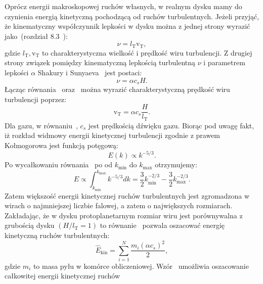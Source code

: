 \par Oprócz energii
makroskopowej ruchów własnych, w realnym dysku mamy do czynienia energią
kinetyczną pochodzącą od ruchów turbulentnych.  Jeżeli przyjąć, że kinematyczny
współczynnik lepkości w dysku można z jednej strony wyrazić jako~(rozdział
8.3~\cite{C98}):
%
\begin{equation}
   \nu = l_{\textrm{T}} \textrm{v}_{\textrm{T}},
   \label{eq:nu1}
\end{equation}
%
gdzie $l_{\textrm{T}}, \textrm{v}_{\textrm{T}}$ to charakterystyczna wielkość i prędkość
wiru turbulencji. Z drugiej strony 
związek pomiędzy kinematyczną lepkością turbulentną $\nu$ i parametrem lepkości
$\alpha$ Shakury i Sunyaeva~\cite{SS73} jest postaci:
%
\begin{equation}
   \nu = \alpha c_s H.
   \label{eq:nu2}
\end{equation}
%
Łącząc równania~ oraz~ można wyrazić charakterystyczną
prędkość wiru turbulencji poprzez:
%
\begin{equation}
   \textrm{v}_{\textrm{T}} = \alpha c_s \frac{H}{l_{\textrm{T}}}.
   \label{eq:velt}
\end{equation}
%
Dla gazu, w równaniu~, $c_s$ jest prędkością dźwięku gazu.
Biorąc pod uwagę fakt, iż rozkład widmowy energii kinetycznej turbulencji
zgodnie z prawem Kołmogorowa jest funkcją potęgową:
\begin{equation}
   E(k) \propto k^{-5/3}.
   \label{eq:ek}
\end{equation}
Po wycałkowaniu równania~ po od $k_\textrm{min}$ do $k_\textrm{max}$
otrzymujemy:
\begin{equation}
   E \propto \int_{k_\textrm{min}}^{k_\textrm{max}} k^{-5/3} dk = \frac{3}{2}
   k_\textrm{min}^{-2/3} -\frac{3}{2}k_\textrm{max}^{-2/3}.
\end{equation}
Zatem większość energii kinetycznej ruchów turbulentnych jest zgromadzona w wirach
o najmniejszej liczbie falowej, a zatem o największych rozmiarach. Zakładając,
że w dysku protoplanetarnym rozmiar wiru jest porównywalna z grubością dysku $(H
/ l_{\textrm{T}} = 1)$ to równanie~ pozwala oszacować energię 
kinetyczną ruchów turbulentnych:
\begin{equation}
   \hat{E}_{\textrm{kin}} = \sum\limits_{i=1}^N \frac{m_i \left(\alpha
   c_s\right)^2}{2},
   \label{eq:ekinturb}
\end{equation}
gdzie $m_i$ to masa pyłu w komórce obliczeniowej. 
Wzór~ umożliwia oszacowanie całkowitej energii kinetycznej ruchów
